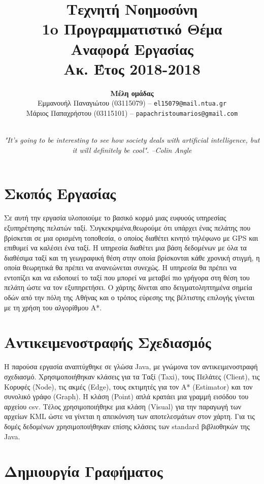 \documentclass[a4paper,12pt]{article}
\title{ \textbf{Τεχνητή Νοημοσύνη}  \\ 1o Προγραμματιστικό Θέμα \\ Αναφορά Εργασίας \\ \small{Ακ. Έτος 2018-2018}}
\author{\textbf{Μέλη ομάδας} \\ Εμμανουήλ Παναγιώτου (03115079) -- \texttt{el15079@mail.ntua.gr} \\  Μάριος Παπαχρήστου (03115101) -- \texttt{papachristoumarios@gmail.com} \\ \noindent\rule{0.9\textwidth}{1pt}}
\date{\emph{"It's going to be interesting to see how society deals with artificial intelligence, but it will definitely be cool". --Colin Angle}}
\begin{document}
\maketitle

\section{Σκοπός Εργασίας} 

Σε αυτή την εργασία υλοποιούμε το βασικό κορμό μιας ευφυούς υπηρεσίας εξυπηρέτησης πελατών ταξί. Συγκεκριμένα,θεωρούμε ότι υπάρχει ένας πελάτης που βρίσκεται σε μια ορισμένη τοποθεσία, ο οποίος διαθέτει κινητό τηλέφωνο με GPS και επιθυμεί να καλέσει ένα ταξί. Η υπηρεσία διαθέτει μια βάση δεδομένων με όλα τα διαθέσιμα ταξί και τη γεωγραφική θέση στην
οποία βρίσκονται κάθε χρονική στιγμή, η οποία θεωρητικά θα πρέπει να ανανεώνεται συνεχώς. Η υπηρεσία θα πρέπει να εντοπίζει και να ειδοποιεί το ταξί που μπορεί να μεταβεί πιο γρήγορα στη θέση του πελάτη ώστε να τον εξυπηρετήσει. Ο χάρτης δίνεται απο δειγματοληπτημένα σημεία οδών από την πόλη της Αθήνας και ο τρόπος εύρεσης της βέλτιστης επιλογής γίνεται με τη χρήση του αλγορίθμου Α*. 

\section{Αντικειμενοστραφής Σχεδιασμός} 

Η παρούσα εργασία αναπτύχθηκε σε γλώσα Java, με γνώμονα τον αντικειμενοστραφή σχεδιασμό. Χρησιμοποιήθηκαν κλάσεις για τα Ταξί (Taxi), τους Πελάτες (Client), τις Κορυφές (Node), τις ακμές (Edge), τους εκτιμητές για τον Α* (Estimator) και τον συνολικό γράφο (Graph). Η κλάση (Point) απλά κρατάει μια γραμμή εισόδου του αρχείου csv. Τέλος χρησιμοποιήθηκε μια κλάση (Visual) για την παραγωγή των αρχείων KML ώστε να γίνεται η απεικόνιση των αποτελεσμάτων στον χάρτη. Για τις δομές δεδομένων χρησιμοποιήθηκαν επίσης κλάσεις των standard βιβλιοθηκών της Java. 

\section{Δημιουργία Γραφήματος}
\end{document}
